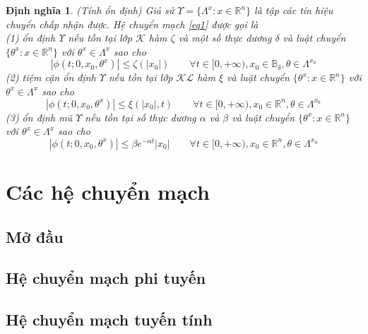 \documentclass[14pt,a4paper,oneside]{report}		%
\newtheorem{define}{Định nghĩa}[chapter]
\begin{document}
\begin{define} (Tính ổn định) Giả sử $\Upsilon = \{\Lambda^x:x\in\mathbb{R}^n\}$ là tập các tín hiệu chuyển chấp nhận được. Hệ chuyển mạch \ref{eq1} được gọi là \\
(1) ổn định $\Upsilon$ nếu tồn tại lớp $\mathcal{K}$ hàm $\zeta$ và một số thực dương $\delta$ và luật chuyển $\{\theta^x:x\in\mathbb{R}^n\}$ với $\theta^x\in\Lambda^x$ sao cho
$$|\phi(t;0,x_0,\theta^x)|\leq\zeta(|x_0|)\qquad\forall t \in [0,+\infty ), x_0 \in\mathbb{B}_\delta , \theta \in\Lambda^{x_0}$$
(2) tiệm cận ổn định $\Upsilon$ nếu tồn tại lớp $\mathcal{KL}$ hàm $\xi$ và luật chuyển $\{\theta^x:x\in\mathbb{R}^n\}$ với $\theta^x\in\Lambda^x$ sao cho
$$|\phi(t;0,x_0,\theta^x)|\leq\xi(|x_0|,t)\qquad\forall t \in [0,+\infty ), x_0 \in\mathbb{R}^n , \theta \in\Lambda^{x_0}$$
(3) ổn định mũ $\Upsilon$ nếu tồn tại số thực dương $\alpha$ và $\beta$ và luật chuyển $\{\theta^x:x\in\mathbb{R}^n\}$ với $\theta^x\in\Lambda^x$ sao cho
$$|\phi(t;0,x_0,\theta^x)|\leq \beta e^{-\alpha t}|x_0|\qquad\forall t \in [0,+\infty ), x_0 \in\mathbb{R}^n , \theta \in\Lambda^{x_0}$$
\end{define}

\chapter{Các hệ chuyển mạch}
\section{Mở đầu}
\section{Hệ chuyển mạch phi tuyến}
\section{Hệ chuyển mạch tuyến tính}
\end{document}
